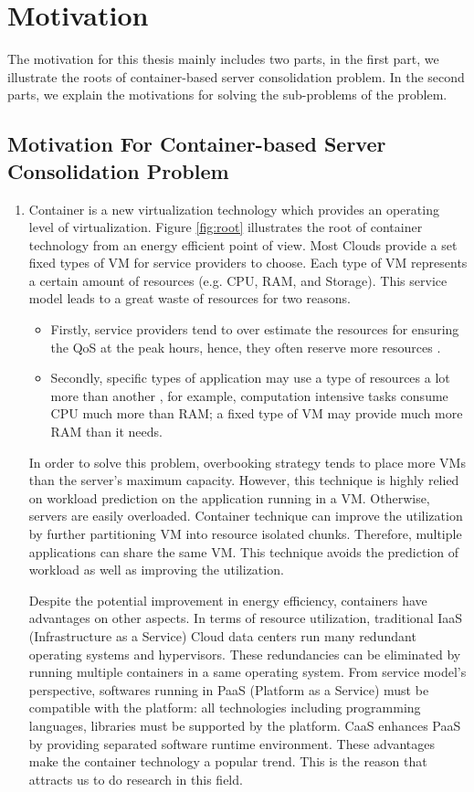 
\section{Motivation}

The motivation for this thesis mainly includes two parts, in the first part, we illustrate the roots of container-based server consolidation problem. In the second parts, we explain the motivations for solving the sub-problems of the problem.

\subsection{Motivation For Container-based Server Consolidation Problem}

\begin{enumerate}
\item Container is a new virtualization technology which provides an operating level of virtualization.
Figure \ref{fig:root} illustrates the root of container technology from an energy efficient point of view. Most Clouds provide a set fixed types of VM for service providers to choose. Each type of VM represents a certain amount of resources (e.g. CPU, RAM, and Storage). This service model leads to a great waste of resources for two reasons. 
\begin{itemize}
	\item Firstly, service providers tend to over estimate the resources for ensuring the QoS at the peak hours, hence, they often reserve more resources \cite{Chaisiri:2012cv}. 
	\item Secondly, specific types of application may use a type of resources a lot more than another \cite{Tomas:2013iv}, for example, computation intensive tasks consume CPU much more than RAM; a fixed type of VM may provide much more RAM than it needs.
\end{itemize}
In order to solve this problem, overbooking strategy tends to place more VMs than the server's maximum capacity. However, this technique is highly relied on workload prediction on the application running in a VM. Otherwise, servers are easily overloaded. Container technique can improve the utilization by further partitioning VM into resource isolated chunks. Therefore, multiple applications can share the same VM. This technique avoids the prediction of workload as well as improving the utilization. 

Despite the potential improvement in energy efficiency, containers have advantages on other aspects. In terms of resource utilization, traditional IaaS (Infrastructure as a Service) Cloud data centers run many redundant operating systems and hypervisors. These redundancies can be eliminated by running multiple containers in a same operating system. From service model's perspective, softwares running in PaaS (Platform as a  Service) must be compatible with the platform: all technologies including programming languages, libraries must be supported by the platform. CaaS enhances PaaS by providing separated software runtime environment. These advantages make the container technology a popular trend. This is the reason that attracts us to
do research in this field.


\end{enumerate}
